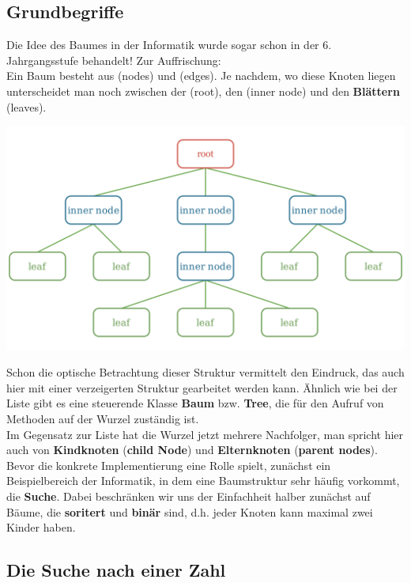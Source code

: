 \documentclass{article}
\begin{document}
\subsection{Grundbegriffe}

Die Idee des Baumes in der Informatik wurde sogar schon in der 6. Jahrgangsstufe behandelt! Zur Auffrischung: \\
Ein Baum besteht aus  (nodes) und  (edges). Je nachdem, wo diese Knoten liegen unterscheidet man noch zwischen der  (root), den  (inner node) und den \textbf{Blättern} (leaves).
\begin{center}
    \includegraphics[scale=0.2]{../media/tree_example.png}
\end{center}
Schon die optische Betrachtung dieser Struktur vermittelt den Eindruck, das auch hier mit einer verzeigerten Struktur gearbeitet werden kann. Ähnlich wie bei der Liste gibt es eine steuerende Klasse \textbf{Baum} bzw. \textbf{Tree}, die für den Aufruf von Methoden auf der Wurzel zuständig ist. \\
Im Gegensatz zur Liste hat die Wurzel jetzt mehrere Nachfolger, man spricht hier auch von \textbf{Kindknoten} (\textbf{child Node}) und \textbf{Elternknoten} (\textbf{parent nodes}). \\
Bevor die konkrete Implementierung eine Rolle spielt, zunächst ein Beispielbereich der Informatik, in dem eine Baumstruktur sehr häufig vorkommt, die \textbf{Suche}. Dabei beschränken wir uns der Einfachheit halber zunächst auf Bäume, die \textbf{soritert} und \textbf{binär} sind, d.h. jeder Knoten kann maximal zwei Kinder haben.

\subsection{Die Suche nach einer Zahl}
\end{document}
